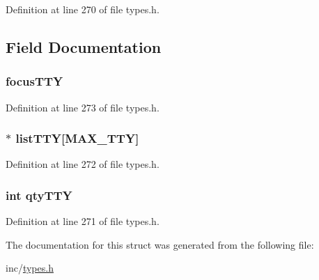 Definition at line 270 of file types.h.



\subsection{Field Documentation}
\hypertarget{structsys_t_t_y_ad4f84dd55c369a7bd7d9f562fc76662f}{
\subsubsection[{focusTTY}]{ {\bf focusTTY}}}
\label{structsys_t_t_y_ad4f84dd55c369a7bd7d9f562fc76662f}


Definition at line 273 of file types.h.

\hypertarget{structsys_t_t_y_a35ea653106226d6fe2191f4f8a203d67}{
\subsubsection[{listTTY}]{$\ast$ {\bf listTTY}\mbox{[}MAX\_\-TTY\mbox{]}}}
\label{structsys_t_t_y_a35ea653106226d6fe2191f4f8a203d67}


Definition at line 272 of file types.h.

\hypertarget{structsys_t_t_y_a0bc680aada6c6392e4613573f212438b}{
\subsubsection[{qtyTTY}]{\setlength{\rightskip}{0pt plus 5cm}int {\bf qtyTTY}}}
\label{structsys_t_t_y_a0bc680aada6c6392e4613573f212438b}


Definition at line 271 of file types.h.



The documentation for this struct was generated from the following file:\begin{DoxyCompactItemize}
\item 
inc/\hyperlink{types_8h}{types.h}\end{DoxyCompactItemize}
